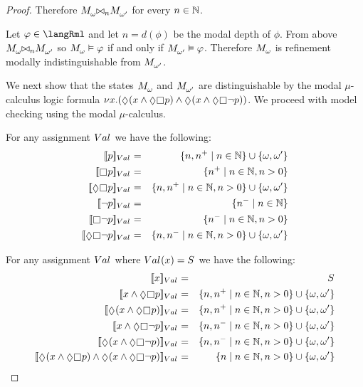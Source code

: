 \begin{proof}
Therefore $\kPModel{\omega} \bisimref[n] \kPModel{\omega'}$ for every $n \in \mathbb{N}$.

Let $\phi \in \langRml$ and let $n = d(\phi)$ be the modal depth of $\phi$.
From above $\kPModel{\omega} \bisimref[n] \kPModel{\omega'}$ so $\kPModel{\omega} \entails \phi$ if and only if $\kPModel{\omega'} \entails \phi$.
Therefore $\kPModel{\omega}$ is refinement modally indistinguishable from $\kPModel{\omega'}$.

We next show that the states $\kPModel{\omega}$ and $\kPModel{\omega'}$ are distinguishable by the modal $\mu$-calculus logic formula $\gfp{\varX} (\possible (\varX \land \possible \necessary \atomP) \land \possible (\varX \land \possible \necessary \neg \atomP))$.
We proceed with model checking using the modal $\mu$-calculus.

For any assignment $\kAssignment$ we have the following:
\begin{eqnarray*}
    \interpretation[\kAssignment]{\atomP} &=& \{n, n^+ \mid n \in \naturals\} \cup \{\omega, \omega'\}\\
    \interpretation[\kAssignment]{\necessary \atomP} &=& \{n^+ \mid n \in \naturals, n > 0\}\\
    \interpretation[\kAssignment]{\possible \necessary \atomP} &=& \{n, n^+ \mid n \in \naturals, n > 0\} \cup \{\omega, \omega'\}\\
    \interpretation[\kAssignment]{\neg \atomP} &=& \{n^- \mid n \in \naturals\}\\
    \interpretation[\kAssignment]{\necessary \neg \atomP} &=& \{n^- \mid n \in \naturals, n > 0\}\\
    \interpretation[\kAssignment]{\possible \necessary \neg \atomP} &=& \{n, n^- \mid n \in \naturals, n > 0\} \cup \{\omega, \omega'\}
\end{eqnarray*}

For any assignment $\kAssignment$ where $\kAssignment(\varX) = \kStates$ we have the following:
\begin{eqnarray*}
    \interpretation[\kAssignment]{\varX} &=& \kStates\\
    \interpretation[\kAssignment]{\varX \land \possible \necessary \atomP} &=& \{n, n^+ \mid n \in \naturals, n > 0\} \cup \{\omega, \omega'\}\\
    \interpretation[\kAssignment]{\possible (\varX \land \possible \necessary \atomP)} &=& \{n, n^+ \mid n \in \naturals, n > 0\} \cup \{\omega, \omega'\}\\
    \interpretation[\kAssignment]{\varX \land \possible \necessary \neg \atomP} &=& \{n, n^- \mid n \in \naturals, n > 0\} \cup \{\omega, \omega'\}\\
    \interpretation[\kAssignment]{\possible (\varX \land \possible \necessary \neg \atomP)} &=& \{n, n^- \mid n \in \naturals, n > 0\} \cup \{\omega, \omega'\}\\
    \interpretation[\kAssignment]{\possible (\varX \land \possible \necessary \atomP) \land \possible (\varX \land \possible \necessary \neg \atomP)} &=& \{n \mid n \in \naturals, n > 0\} \cup \{\omega, \omega'\}
\end{eqnarray*}


\end{proof}

